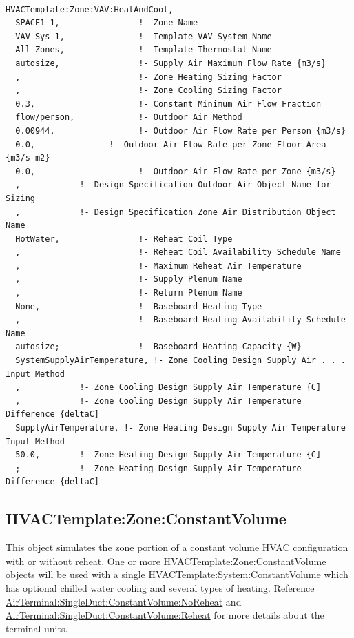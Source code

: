\begin{lstlisting}

HVACTemplate:Zone:VAV:HeatAndCool,
  SPACE1-1,                !- Zone Name
  VAV Sys 1,               !- Template VAV System Name
  All Zones,               !- Template Thermostat Name
  autosize,                !- Supply Air Maximum Flow Rate {m3/s}
  ,                        !- Zone Heating Sizing Factor
  ,                        !- Zone Cooling Sizing Factor
  0.3,                     !- Constant Minimum Air Flow Fraction
  flow/person,             !- Outdoor Air Method
  0.00944,                 !- Outdoor Air Flow Rate per Person {m3/s}
  0.0,               !- Outdoor Air Flow Rate per Zone Floor Area {m3/s-m2}
  0.0,                     !- Outdoor Air Flow Rate per Zone {m3/s}
  ,            !- Design Specification Outdoor Air Object Name for Sizing
  ,            !- Design Specification Zone Air Distribution Object Name
  HotWater,                !- Reheat Coil Type
  ,                        !- Reheat Coil Availability Schedule Name
  ,                        !- Maximum Reheat Air Temperature
  ,                        !- Supply Plenum Name
  ,                        !- Return Plenum Name
  None,                    !- Baseboard Heating Type
  ,                        !- Baseboard Heating Availability Schedule Name
  autosize;                !- Baseboard Heating Capacity {W}
  SystemSupplyAirTemperature, !- Zone Cooling Design Supply Air . . . Input Method
  ,            !- Zone Cooling Design Supply Air Temperature {C]
  ,            !- Zone Cooling Design Supply Air Temperature Difference {deltaC]
  SupplyAirTemperature, !- Zone Heating Design Supply Air Temperature Input Method
  50.0,        !- Zone Heating Design Supply Air Temperature {C]
  ;            !- Zone Heating Design Supply Air Temperature Difference {deltaC]
\end{lstlisting}

\subsection{HVACTemplate:Zone:ConstantVolume}\label{hvactemplatezoneconstantvolume}

This object simulates the zone portion of a constant volume HVAC configuration with or without reheat. One or more HVACTemplate:Zone:ConstantVolume objects will be used with a single \hyperref[hvactemplatesystemconstantvolume]{HVACTemplate:System:ConstantVolume} which has optional chilled water cooling and several types of heating. Reference \hyperref[airterminalsingleductconstantvolumenoreheat]{AirTerminal:SingleDuct:ConstantVolume:NoReheat} and \hyperref[airterminalsingleductconstantvolumereheat]{AirTerminal:SingleDuct:ConstantVolume:Reheat} for more details about the terminal units.

